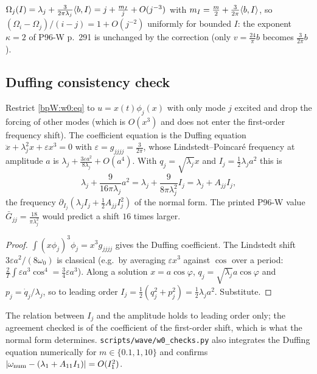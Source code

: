 \begin{remark}\label{bpW:w0n:kappa}
$\Omega_j(I)=\lambda_j+\frac{3}{2\pi\lambda_j}\langle b,I\rangle=j+\frac{m_I}{j}+O(j^{-3})$ with
$m_I=\frac m2+\frac{3}{2\pi}\langle b,I\rangle$, so $(\Omega_i-\Omega_j)/(i-j)=1+O(j^{-2})$ uniformly for bounded $I$: the
exponent $\kappa=2$ of P96-W p.~291 is unchanged by the correction (only $v=\frac{24}\pi b$ becomes $\frac{3}{2\pi}b$).
\end{remark}

\subsection{Duffing consistency check}\label{bpW:w0n:duffing-sec}

\begin{proposition}\label{bpW:w0n:duffing}
Restrict \eqref{bpW:w0:eq} to $u=x(t)\phi_j(x)$ with only mode $j$ excited and drop the forcing of other modes
(which is $O(x^3)$ and does not enter the first-order frequency shift). The coefficient equation is the Duffing
equation $\ddot x+\lambda_j^2x+\varepsilon x^3=0$ with $\varepsilon=g_{jjjj}=\frac{3}{2\pi}$, whose
Lindstedt--Poincar\'e frequency at amplitude $a$ is $\lambda_j+\frac{3\varepsilon a^2}{8\lambda_j}+O(a^4)$. With
$q_j=\sqrt{\lambda_j}x$ and $I_j=\frac12\lambda_ja^2$ this is
\[\lambda_j+\frac{9}{16\pi\lambda_j}a^2=\lambda_j+\frac{9}{8\pi\lambda_j^2}I_j=\lambda_j+A_{jj}I_j,\]
the frequency $\partial_{I_j}(\lambda_jI_j+\frac12A_{jj}I_j^2)$ of the normal form. The printed P96-W value
$\bar G_{jj}=\frac{18}{\pi\lambda_j^2}$ would predict a shift $16$ times larger.
\end{proposition}

\begin{proof}
$\int(x\phi_j)^3\phi_j=x^3g_{jjjj}$ gives the Duffing coefficient. The Lindstedt shift $3\varepsilon a^2/(8\omega_0)$ is
classical (e.g.\ by averaging $\varepsilon x^3$ against $\cos$ over a period: $\frac{2}{T}\int\varepsilon
a^3\cos^4=\frac34\varepsilon a^3$). Along a solution $x=a\cos\varphi$, $q_j=\sqrt{\lambda_j}a\cos\varphi$ and
$p_j=\dot q_j/\lambda_j$, so to leading order $I_j=\frac12(q_j^2+p_j^2)=\frac12\lambda_ja^2$. Substitute.
\end{proof}
\begin{remark}
The relation between $I_j$ and the amplitude holds to leading order only; the agreement checked is of the
coefficient of the first-order shift, which is what the normal form determines. \texttt{scripts/wave/w0\_checks.py}
also integrates the Duffing equation numerically for $m\in\{0.1,1,10\}$ and confirms
$\lvert \omega_{\rm num}-(\lambda_1+A_{11}I_1)\rvert=O(I_1^2)$.
\end{remark}

